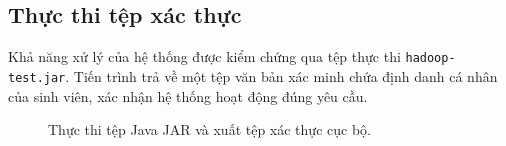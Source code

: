 \subsection{Thực thi tệp xác thực}
Khả năng xử lý của hệ thống được kiểm chứng qua tệp thực thi \texttt{hadoop-test.jar}. Tiến trình trả về một tệp văn bản xác minh chứa định danh cá nhân của sinh viên, xác nhận hệ thống hoạt động đúng yêu cầu.

\begin{figure}[H]
    \centering
    \caption{Thực thi tệp Java JAR và xuất tệp xác thực cục bộ.}
    \label{fig:hdfs_verification}
\end{figure}

